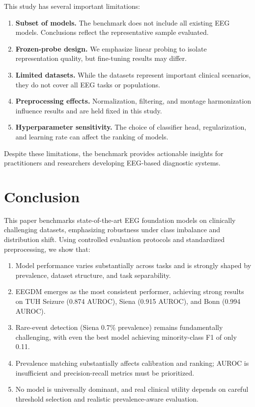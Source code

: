 \documentclass[journal]{IEEEtran}
\begin{document}
This study has several important limitations:

\begin{enumerate}
  \item \textbf{Subset of models.} The benchmark does not include all existing EEG models. Conclusions reflect the representative sample evaluated.
  \item \textbf{Frozen-probe design.} We emphasize linear probing to isolate representation quality, but fine-tuning results may differ.
  \item \textbf{Limited datasets.} While the datasets represent important clinical scenarios, they do not cover all EEG tasks or populations.
  \item \textbf{Preprocessing effects.} Normalization, filtering, and montage harmonization influence results and are held fixed in this study.
  \item \textbf{Hyperparameter sensitivity.} The choice of classifier head, regularization, and learning rate can affect the ranking of models.
\end{enumerate}

Despite these limitations, the benchmark provides actionable insights for practitioners and researchers developing EEG-based diagnostic systems.

\section{Conclusion}

This paper benchmarks state-of-the-art EEG foundation models on clinically challenging datasets, emphasizing robustness under class imbalance and distribution shift. Using controlled evaluation protocols and standardized preprocessing, we show that:

\begin{enumerate}
  \item Model performance varies substantially across tasks and is strongly shaped by prevalence, dataset structure, and task separability.
  \item EEGDM emerges as the most consistent performer, achieving strong results on TUH Seizure (0.874 AUROC), Siena (0.915 AUROC), and Bonn (0.994 AUROC).
  \item Rare-event detection (Siena 0.7\% prevalence) remains fundamentally challenging, with even the best model achieving minority-class F1 of only 0.11.
  \item Prevalence matching substantially affects calibration and ranking; AUROC is insufficient and precision-recall metrics must be prioritized.
  \item No model is universally dominant, and real clinical utility depends on careful threshold selection and realistic prevalence-aware evaluation.
\end{enumerate}
\end{document}
